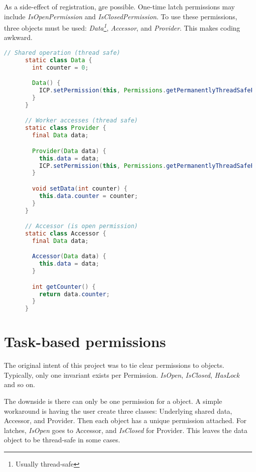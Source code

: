 \documentclass[11pt]{article}
\begin{document}
    As a side-effect of registration, \hyperlink{Task-Based Permissions} are possible. One-time latch permissions
    may include \textit{IsOpenPermission} and \textit{IsClosedPermission}. To use these permissions, three objects must
    be used: \textit{Data\footnote{Usually thread-safe}}, \textit{Accessor}, and \textit{Provider}. This makes coding
    awkward.

    \begin{lstlisting}[language=java]
      // Shared operation (thread safe)
      static class Data {
        int counter = 0;

        Data() {
          ICP.setPermission(this, Permissions.getPermanentlyThreadSafePermission());
        }
      }

      // Worker accesses (thread safe)
      static class Provider {
        final Data data;

        Provider(Data data) {
          this.data = data;
          ICP.setPermission(this, Permissions.getPermanentlyThreadSafePermission());
        }

        void setData(int counter) {
          this.data.counter = counter;
        }
      }

      // Accessor (is open permission)
      static class Accessor {
        final Data data;

        Accessor(Data data) {
          this.data = data;
        }

        int getCounter() {
          return data.counter;
        }
      }
    \end{lstlisting}

    \section{Task-based permissions}
    The original intent of this project was to tie clear permissions to objects. Typically, only one invariant
    exists per Permission. \textit{IsOpen}, \textit{IsClosed}, \textit{HasLock} and so on.

    The downside is there can only be one permission for a object. A simple workaround is having the user create
    three classes: Underlying shared data, Accessor, and Provider. Then each object has a unique permission attached.
    For latches, \textit{IsOpen} goes to Accessor, and \textit{IsClosed} for Provider. This leaves the data object to
    be thread-safe in some cases.

\end{document}
